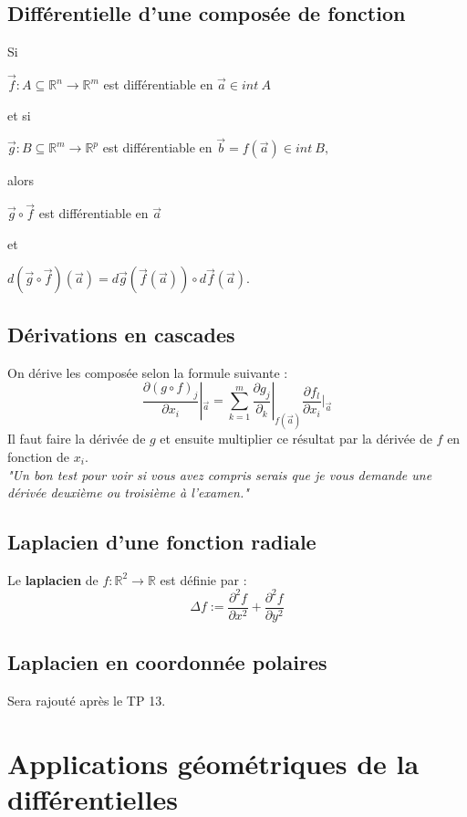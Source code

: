 \documentclass[11pt, a4paper, openany]{book}
\begin{document}
\subsection{Différentielle d'une composée de fonction}
Si
\begin{center}
	$\vec{f} : A \subseteq \mathbb{R}^n \rightarrow \mathbb{R}^m$ est différentiable en $\vec{a} \in int\ A$
\end{center}
et si
\begin{center}
	$\vec{g} : B \subseteq \mathbb{R}^m \rightarrow \mathbb{R}^p$ est différentiable en $\vec{b} = f(\vec{a}) \in int\ B,$
\end{center}
alors
\begin{center}
	$\vec{g} \circ \vec{f}$ est différentiable en $\vec{a}$
\end{center}
et
\begin{center}
	$d(\vec{g} \circ \vec{f})(\vec{a}) = d\vec{g} (\vec{f}(\vec{a})) \circ d\vec{f}(\vec{a}).$
\end{center}


\subsection{Dérivations en cascades}
On dérive les composée selon la formule suivante :
$$\frac{\partial(g \circ f)_j}{\partial x_i}|_{\vec{a}} = \sum_{k=1}^m \frac{\partial g_j}{\partial _k}|_{f(\vec{a})} \frac{\partial f_l}{\partial x_i}|_{\vec{a}}$$
Il faut faire la dérivée de $g$ et ensuite multiplier ce résultat par la dérivée de $f$ en fonction de $x_i$. \\
\textit{"Un bon test pour voir si vous avez compris serais que je vous demande une dérivée deuxième ou troisième à l'examen."}

\subsection{Laplacien d'une fonction radiale}
Le \textbf{laplacien} de $f : \mathbb{R}^2 \rightarrow \mathbb{R}$ est définie par :
$$\Delta f := \frac{\partial^2f}{\partial x^2} + \frac{\partial^2f}{\partial y^2}$$

\subsection{Laplacien en coordonnée polaires}
Sera rajouté après le TP 13.

\section{Applications géométriques de la différentielles}
\end{document}
